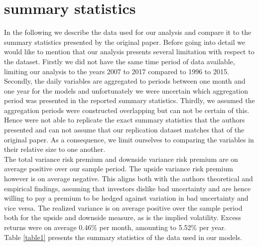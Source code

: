 \documentclass{article}
\begin{document}
\section{summary statistics}

In the following we describe the data used for our analysis and compare it to the summary statistics presented by the original paper. Before going into detail we would like to mention that our analysis presents several limitation with respect to the dataset. Firstly we did not have the same time period of data available, limiting our analysis to the years 2007 to 2017 compared to 1996 to 2015. Secondly, the daily variables are aggregated to periods between one month and one year for the models and unfortunately we were uncertain which aggregation period was presented in the reported summary statistics.  Thirdly, we assumed the aggregation periods were constructed overlapping but can not be certain of this. Hence were not able to replicate the exact summary statistics that the authors presented and can not assume that our replication dataset matches that of the original paper. As a consequence, we limit ourselves to comparing the variables in their relative size to one another.\\

The total variance risk premium and downside variance risk premium are on average positive over our sample period. The upside variance risk premium however is on average negative. This aligns both with the authors theoretical and empirical findings, assuming that investors dislike bad uncertainty and are hence willing to pay a premium to be hedged against variation in bad uncertainty and vice versa. The realized variance is on average positive over the sample period both for the upside and downside measure, as is the implied volatility. Excess returns were on average 0.46$\%$ per month, amounting to 5.52$\%$ per year.\\


Table \ref{table1} presents the summary statistics of the data used in our models. 
\end{document}
